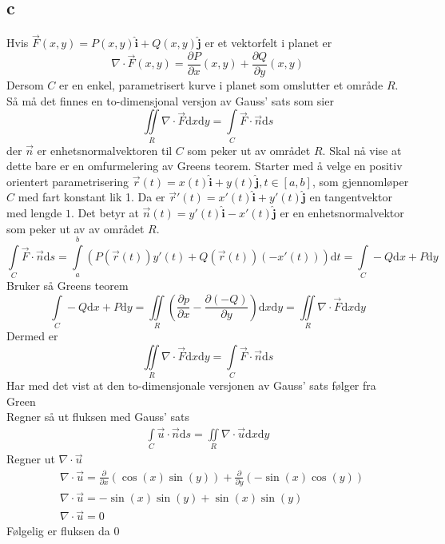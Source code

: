 \documentclass[a4paper,10pt,norsk]{article}
\newcommand{\dd}[1]{\mathrm{d}#1}
\newcommand{\uvec}[1]{\boldsymbol{\hat{\textbf{#1}}}}
\begin{document}
	\subsection*{c}
	Hvis $\vec{F} (x,y) = P(x,y) \uvec{i} + Q(x,y) \uvec{j}$ er et vektorfelt i planet er \[
		\nabla \cdot \vec{F} (x,y) = \frac{\partial P}{\partial x} (x,y) + \frac{\partial Q}{\partial y} (x,y)
	\] 
		Dersom $C$ er en enkel, parametrisert kurve i planet som omslutter et område $R$.
		Så må det finnes en to-dimensjonal versjon av Gauss' sats som sier \[
		\iint\limits_R \nabla \cdot \vec{F}  \dd{x}\dd{y} = \int\limits_C \vec{F} \cdot \vec{n}  \dd{s}
		\] 
		der $\vec{n} $ er enhetsnormalvektoren til $C$ som peker ut av området $R$.
		Skal nå vise at dette bare er en omfurmelering av Greens teorem.
		Starter med å velge en positiv orientert parametrisering $\vec{r} (t) = x(t) \uvec{i} + y(t) \uvec{j}, t \in [a,b]$, som gjennomløper $C$ med fart konstant lik 1.
		Da er $\overrightarrow{r}'(t) = x'(t) \uvec{i} + y'(t) \uvec{j}$ en tangentvektor med lengde $1$.
		Det betyr at $\vec{n} (t) = y'(t) \uvec{i} - x'(t) \uvec{j}$ er en enhetsnormalvektor som peker ut av av området $R$.  \[
			\int\limits_C \vec{F} \cdot \vec{n} \dd{s}= \int\limits_a^b \left( P \left( \vec{r} (t) \right) y'(t) + Q \left( \vec{r} (t) \right) \left( -x'(t) \right)  \right) \dd{t}
			= \int\limits_C -Q \dd{x}+P \dd{y}
		\] 
		Bruker så Greens teorem \[
			\int\limits_C -Q \dd{x} + P \dd{y} = \iint\limits_R \left( \frac{\partial p}{\partial x} - \frac{\partial (-Q)}{\partial y}  \right) \dd{x}\dd{y}= \iint\limits_R \nabla \cdot \vec{F} \dd{x}\dd{y}
		\] 
		Dermed er \[
		\iint\limits_R \nabla \cdot \vec{F} \dd{x}\dd{y}= \int\limits_C \vec{F} \cdot \vec{n} \dd{s}
		\] 
		Har med det vist at den to-dimensjonale versjonen av Gauss' sats følger fra Green\\
		Regner så ut fluksen med Gauss' sats
		\begin{align*}
			\int\limits_C \vec{u}  \cdot \vec{n} \dd{s} = \iint \limits_R \nabla \cdot \vec{u} \dd{x}\dd{y}
		\end{align*}
		Regner ut $\nabla \cdot \vec{u} $ 
		\begin{align*}
			&\nabla \cdot \vec{u} = \frac{\partial }{\partial x} \left( \cos(x) \sin(y)  \right) + \frac{\partial }{\partial y} \left( -\sin(x) \cos(y)  \right) \\
			&\nabla \cdot \vec{u} = - \sin(x) \sin(y) + \sin(x) \sin(y) \\
			&\nabla \cdot \vec{u} = 0
		\end{align*}
		Følgelig er fluksen da $0$\\
\end{document}
